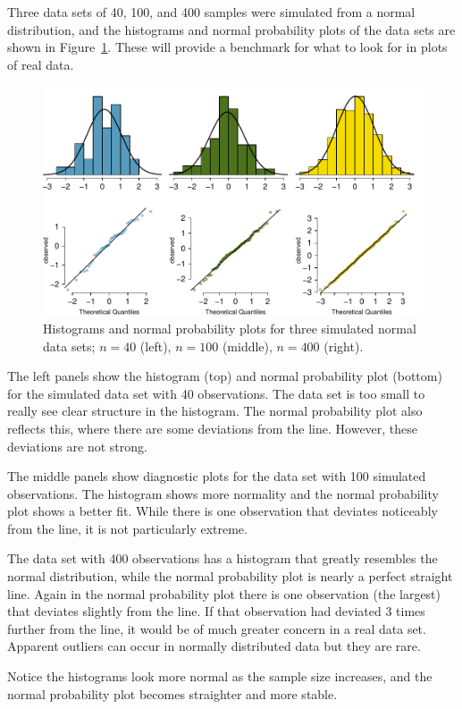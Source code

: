 \begin{example}{Three data sets of 40, 100, and 400 samples were simulated from a normal distribution, and the histograms and normal probability plots of the data sets are shown in Figure~\ref{normalExamples}. These will provide a benchmark for what to look for in plots of real data.} \label{normalExamplesExample}

\begin{figure}[H]
\centering
\hspace*{0.5cm}\includegraphics[width=\textwidth]{03/figures/normalExamples/normalExamples}
\caption{Histograms and normal probability plots for three simulated normal data sets; $n=40$ (left), $n=100$ (middle), $n=400$ (right).}
\label{normalExamples}
\end{figure}

The left panels show the histogram (top) and normal probability plot (bottom) for the simulated data set with 40 observations. The data set is too small to really see clear structure in the histogram. The normal probability plot also reflects this, where there are some deviations from the line. However, these deviations are not strong.

The middle panels show diagnostic plots for the data set with 100 simulated observations. The histogram shows more normality and the normal probability plot shows a better fit. While there is one observation that deviates noticeably from the line, it is not particularly extreme.

The data set with 400 observations has a histogram that greatly resembles the normal distribution, while the normal probability plot is nearly a perfect straight line. Again in the normal probability plot there is one observation (the largest) that deviates slightly from the line. If that observation had deviated 3 times further from the line, it would be of much greater concern in a real data set. Apparent outliers can occur in normally distributed data but they are rare.

Notice the histograms look more normal as the sample size increases, and the normal probability plot becomes straighter and more stable.
\end{example}

